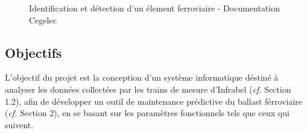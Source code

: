\begin{itemize}
     \begin{figure}[H]
        \centering
        \caption{Identification et détection d'un élement ferroviaire - Documentation Cegelec \cite{Hyperion-interface}} 
    \end{figure}   
    
\end{itemize}


\subsection{Objectifs} 

L'objectif du projet est la conception d'un système informatique déstiné à analyser les données collectées par les trains de mesure d'Infrabel (\textit{cf.} Section 1.2), afin de développer un outil de maintenance prédictive du ballast férroviaire (\textit{cf.} Section 2), en se basant sur les paramètres fonctionnels tels que ceux qui suivent.

